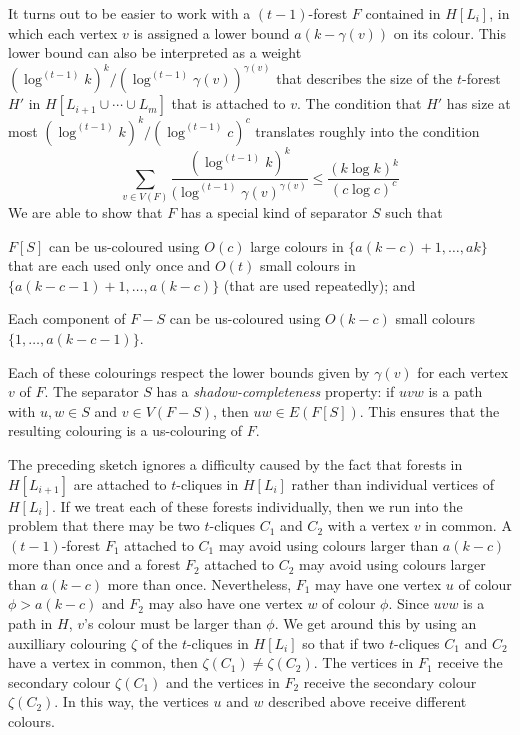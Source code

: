 \documentclass[kpfonts]{patmorin}
\theoremstyle{named}
\begin{document}
It turns out to be easier to work with a $(t-1)$-forest $F$ contained in $H[L_i]$, in which each vertex $v$ is assigned a lower bound $a(k-\gamma(v))$ on its colour.  This lower bound can also be interpreted as a weight  $(\log^{(t-1)}k)^k/(\log^{(t-1)}\gamma(v))^{\gamma(v)}$ that describes the size of the $t$-forest $H'$ in $H[L_{i+1}\cup\cdots\cup L_m]$ that is attached to $v$.  The condition that $H'$ has size at most $(\log^{(t-1)} k)^k/(\log^{(t-1)} c)^c$ translates roughly into the condition
\[
   \sum_{v\in V(F)}\frac{(\log^{(t-1)}k)^k}{(\log^{(t-1)}\gamma(v)^{\gamma(v)}} \le \frac{(k\log k)^k}{(c\log c)^c}
\]
We are able to show that $F$ has a special kind of separator $S$ such that
\begin{compactenum}
    \item $F[S]$ can be us-coloured using $O(c)$ large colours in $\{a(k-c)+1,\ldots,ak\}$ that are each used only once and $O(t)$ small colours in $\{a(k-c-1)+1,\ldots,a(k-c)\}$ (that are used repeatedly); and
    \item Each component of $F-S$ can be us-coloured using $O(k-c)$ small colours $\{1,\ldots,a(k-c-1)\}$.
\end{compactenum}
Each of these colourings respect the lower bounds given by $\gamma(v)$ for each vertex $v$ of $F$.  The separator $S$ has a \emph{shadow-completeness} property: if $uvw$ is a path with $u,w\in S$ and $v\in V(F-S)$, then $uw\in E(F[S])$.  This ensures that the resulting colouring is a us-colouring of $F$.

The preceding sketch ignores a difficulty caused by the fact that forests in $H[L_{i+1}]$ are attached to $t$-cliques in $H[L_i]$ rather than individual vertices of $H[L_i]$.  If we treat each of these forests individually, then we run into the problem that there may be two $t$-cliques $C_1$ and $C_2$ with a vertex $v$ in common.  A $(t-1)$-forest $F_1$ attached to $C_1$ may avoid using colours larger than $a(k-c)$ more than once and a forest $F_2$ attached to $C_2$ may avoid using colours larger than $a(k-c)$ more than once.  Nevertheless, $F_1$ may have one vertex $u$ of colour $\phi >a(k-c)$ and $F_2$ may also have one vertex $w$ of colour $\phi$.  Since $uvw$ is a path in $H$, $v$'s colour must be larger than $\phi$.  We get around this by using an auxilliary colouring $\zeta$ of the $t$-cliques in $H[L_i]$ so that if two $t$-cliques $C_1$ and $C_2$ have a vertex in common, then $\zeta(C_1)\neq \zeta(C_2)$.  The vertices in $F_1$ receive the secondary colour $\zeta(C_1)$ and the vertices in $F_2$ receive the secondary colour $\zeta(C_2)$.  In this way, the vertices $u$ and $w$ described above receive different colours.
\end{document}
